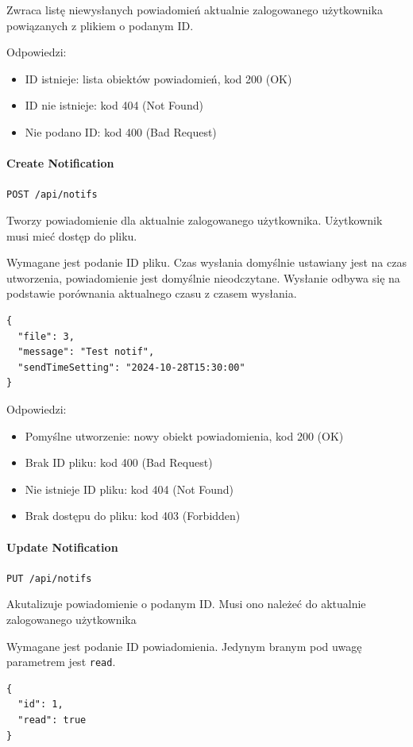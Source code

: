 \documentclass[a4paper,twoside,12pt]{book}
\begin{document}
Zwraca listę niewysłanych powiadomień aktualnie zalogowanego użytkownika powiązanych z plikiem o podanym ID.

Odpowiedzi: 
\begin{itemize}
	\item ID istnieje: lista obiektów powiadomień, kod 200 (OK) 
	\item ID nie istnieje: kod 404 (Not Found) 
	\item Nie podano ID: kod 400 (Bad Request)
\end{itemize}

\paragraph{Create Notification}

\texttt{POST /api/notifs}

Tworzy powiadomienie dla aktualnie zalogowanego użytkownika. Użytkownik musi mieć dostęp do pliku.

Wymagane jest podanie ID pliku. Czas wysłania domyślnie ustawiany jest na czas utworzenia, powiadomienie jest domyślnie nieodczytane. Wysłanie odbywa się na podstawie porównania aktualnego czasu z czasem wysłania.

\begin{verbatim}
{
  "file": 3,
  "message": "Test notif",
  "sendTimeSetting": "2024-10-28T15:30:00"
}
\end{verbatim}

Odpowiedzi: 
\begin{itemize}
	\item Pomyślne utworzenie: nowy obiekt powiadomienia, kod 200 (OK) 
	\item Brak ID pliku: kod 400 (Bad Request) 
	\item Nie istnieje ID pliku: kod 404 (Not Found)
	\item Brak dostępu do pliku: kod 403 (Forbidden)
\end{itemize}

\paragraph{Update Notification}

\texttt{PUT /api/notifs}

Akutalizuje powiadomienie o podanym ID. Musi ono należeć do aktualnie zalogowanego użytkownika

Wymagane jest podanie ID powiadomienia. Jedynym branym pod uwagę parametrem jest \texttt{read}.
\begin{verbatim}
{
  "id": 1,
  "read": true
}
\end{verbatim}
\end{document}
